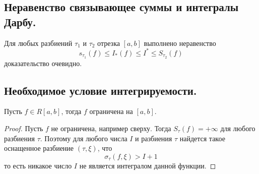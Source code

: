 \documentclass{article}
\begin{document}
\subsection{Неравенство связывающее суммы и интегралы Дарбу.}
Для любых разбиений $\tau_1$ и $\tau_2$ отрезка $[a, b]$ выполнено неравенство
$$
    s_{\tau_1}(f) \leq I_*(f) \leq I^* \leq S_{\tau_2}(f)
$$
доказательство очевидно.
\subsection{Необходимое условие интегрируемости.}
Пусть $f \in R[a, b]$, тогда $f$ ограничена на $[a, b]$.
\begin{proof}
    Пусть $f$ не ограничена, например сверху. Тогда $S_\tau(f) = +\infty$ для любого разбиения $\tau$. Поэтому для любого числа $I$ и разбиения $\tau$ найдется такое оснащенное разбиение $(\tau, \xi)$, что
    $$
        \sigma_\tau(f, \xi) > I + 1
    $$
    то есть никакое число $I$ не является интегралом данной функции.
\end{proof}
\end{document}
